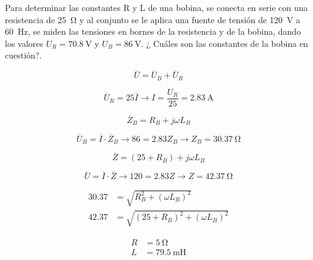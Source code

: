 \documentclass[12pt]{article}
\begin{document}
Para determinar las constantes R y L de una bobina, se conecta en serie con una resistencia de \SI{25}{\ohm} y al conjunto se le aplica una fuente de tensión de \SI{120}{\volt} a \SI{60}{\hertz}, se miden las tensiones en bornes de la resistencia y de la bobina, dando los valores $U_R = \SI{70.8}{\volt}$ y $U_B = \SI{86}{\volt}$. ¿ Cuáles son las constantes de la bobina en cuestión?.

\begin{equation*}
  \overline{U} = \overline{U}_B + \overline{U}_R
\end{equation*}



\begin{equation*}
  \overline{U}_R = 25 \overline{I} \rightarrow I = \frac{U_R}{25} = \SI{2.83}{\ampere}
\end{equation*}

\begin{equation*}
  \overline{Z}_B = R_B + j\omega L_B
\end{equation*}

\begin{equation*}
  \overline{U}_B = \overline{I} \cdot \overline{Z}_B \rightarrow 86 = 2.83 Z_B \rightarrow Z_B = \SI{30.37}{\ohm}
\end{equation*}

\begin{equation*}
  \overline{Z} = (25 + R_B) + j\omega L_B
\end{equation*}

\begin{equation*}
  \overline{U} = \overline{I} \cdot \overline{Z} \rightarrow 120 = 2.83 Z \rightarrow Z = \SI{42.37}{\ohm}
\end{equation*}

\begin{align*}
  30.37 &= \sqrt{R^2_B + (\omega L_B)^2}\\
  42.37 &= \sqrt{(25 + R_B)^2 + (\omega L_B)^2}
\end{align*}

\begin{align*}
  R &= \SI{5}{\ohm}\\
  L &= \SI{79.5}{\milli\henry}
\end{align*}

\clearpage


\section{}
\end{document}

